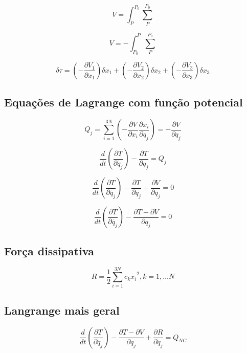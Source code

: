 $$ V = \int_{P}^{P_0} \sum_{P}^{P_0} $$

$$ V = - \int_{P_0}^{P} \sum_{P}^{P_0} $$

$$ \boxed{\delta \tau = (-\frac{\partial V_1}{\partial x_1})\delta x_1 + (-\frac{\partial V_2}{\partial x_2})\delta x_2 + (-\frac{\partial V_3}{\partial x_3})\delta x_3}$$

\subsection{Equações de Lagrange com função potencial}

$$Q_j = \sum_{i=1}^{3N} (-\frac{\partial V}{\partial x_i}\frac{\partial x_i}{\partial q_j}) = -\frac{\partial V}{\partial q_j} $$

$$ \frac{d}{dt}(\frac{\partial T}{\partial \dot{q_j}}) - \frac{\partial T}{\partial q_j} = Q_j $$

$$ \frac{d}{dt}(\frac{\partial T}{\partial \dot{q_j}}) - \frac{\partial T}{\partial q_j} + \frac{\partial V}{\partial q_j} = 0 $$

$$ \boxed{\frac{d}{dt}(\frac{\partial T}{\partial \dot{q_j}}) - \frac{\partial T - \partial V}{\partial q_j} = 0} $$

\subsection{Força dissipativa}

$$ R = \frac{1}{2} \sum_{i=1}^{3N} c_k\dot{x_i}^2, k=1, \dots N $$

\subsection{Langrange mais geral}

$$ \boxed{\frac{d}{dt}(\frac{\partial T}{\partial \dot{q_j}}) - \frac{\partial T - \partial V}{\partial q_j} + \frac{\partial R}{\partial \dot{q_j}} = Q_{NC}} $$






